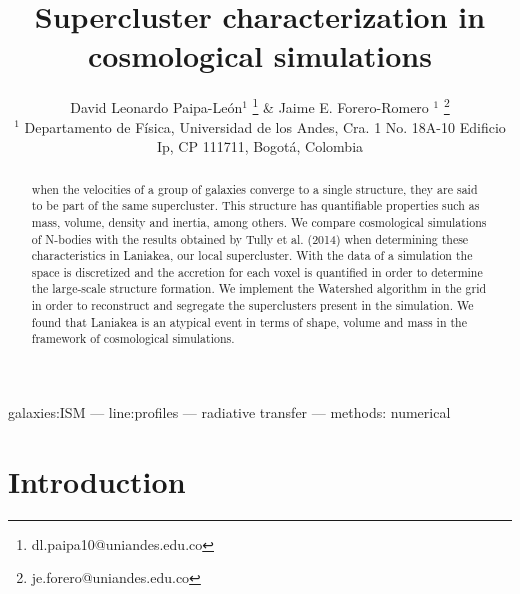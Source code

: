 \documentclass[a4paper,fleqn,usenatbib]{mnras}
\begin{document}
\title[Supercluster characterization in cosmological simulations]{Supercluster characterization in cosmological simulations}  
\author[D.L. Paipa-Leon \& J.E. Forero-Romero]{
  David Leonardo  Paipa-Le\'on$^{1}$
  \thanks{dl.paipa10@uniandes.edu.co} \&
  Jaime E. Forero-Romero $^{1}$
  \thanks{je.forero@uniandes.edu.co}\\
  $^{1}$ Departamento de F\'isica, Universidad de los Andes, Cra. 1
  No. 18A-10 Edificio Ip, CP 111711, Bogot\'a, Colombia \\
}
\maketitle
\begin{abstract}
when the velocities of a group of galaxies converge to a single structure, they are said to be part of the same supercluster. This structure has quantifiable properties such as mass, volume, density and inertia, among others.
 We compare cosmological simulations of N-bodies with the results obtained by Tully et al. (2014)  when determining these characteristics in Laniakea, our local supercluster.
 With the data of a simulation the space is discretized and the accretion for each voxel is quantified in order to determine the large-scale structure formation. We implement the Watershed algorithm in the grid in order to reconstruct and segregate the superclusters present in the simulation. We found  that Laniakea is an atypical event in terms of shape, volume and mass in the framework of cosmological simulations.


\end{abstract}

\begin{keywords}
galaxies:ISM --- line:profiles --- radiative transfer --- methods: numerical
\end{keywords}




\section{Introduction}
\label{sec:intro}
\end{document}
